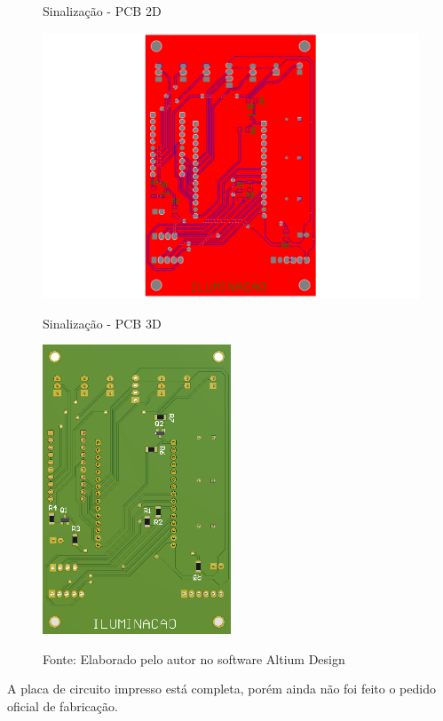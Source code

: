 \documentclass[../delivery_hospital_report.tex]{subfiles}
\begin{document}
\begin{figure}[!h]
    \centering
    \begin{minipage}{0.5\textwidth}
        \centering
        \caption{Sinalização - PCB 2D}
        \includegraphics[width=1.03\textwidth]{modulos/Sinalização_Official-5.png} 
        \label{fig:figura1minipg}
    \end{minipage}\hfill
    \begin{minipage}{0.5\textwidth}
        \centering
        \caption{Sinalização - PCB 3D }
        \includegraphics[width=0.5\textwidth]{modulos/Sinalização_Official.png} 
        \label{fig:figura1minipg}
    \end{minipage}\hfill
    
    \caption*{Fonte: Elaborado pelo autor no software Altium Design\cite{altium21} }
    \label{fig:Sinalização - PCB 2D3D}
\end{figure}

A placa de circuito impresso está completa, porém ainda não foi feito o pedido oficial de fabricação.

\end{document}
